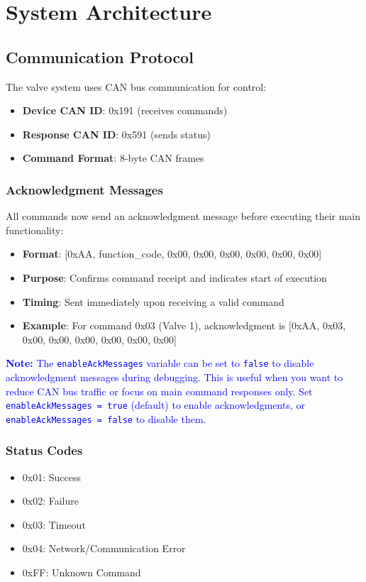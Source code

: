 \documentclass[11pt,a4paper]{article}
\newcommand{\code}[1]{\texttt{#1}}
\newcommand{\note}[1]{\textcolor{blue}{\textbf{Note:} #1}}
\begin{document}
\section{System Architecture}

\subsection{Communication Protocol}
The valve system uses CAN bus communication for control:

\begin{itemize}
    \item \textbf{Device CAN ID}: 0x191 (receives commands)
    \item \textbf{Response CAN ID}: 0x591 (sends status)
    \item \textbf{Command Format}: 8-byte CAN frames
\end{itemize}

\subsubsection{Acknowledgment Messages}
All commands now send an acknowledgment message before executing their main functionality:
\begin{itemize}
    \item \textbf{Format}: [0xAA, function\_code, 0x00, 0x00, 0x00, 0x00, 0x00, 0x00]
    \item \textbf{Purpose}: Confirms command receipt and indicates start of execution
    \item \textbf{Timing}: Sent immediately upon receiving a valid command
    \item \textbf{Example}: For command 0x03 (Valve 1), acknowledgment is [0xAA, 0x03, 0x00, 0x00, 0x00, 0x00, 0x00, 0x00]
\end{itemize}

\note{The \code{enableAckMessages} variable can be set to \code{false} to disable acknowledgment messages during debugging. This is useful when you want to reduce CAN bus traffic or focus on main command responses only. Set \code{enableAckMessages = true} (default) to enable acknowledgments, or \code{enableAckMessages = false} to disable them.}

\subsubsection{Status Codes}
\begin{itemize}
    \item 0x01: Success
    \item 0x02: Failure
    \item 0x03: Timeout
    \item 0x04: Network/Communication Error
    \item 0xFF: Unknown Command
\end{itemize}
\end{document}
